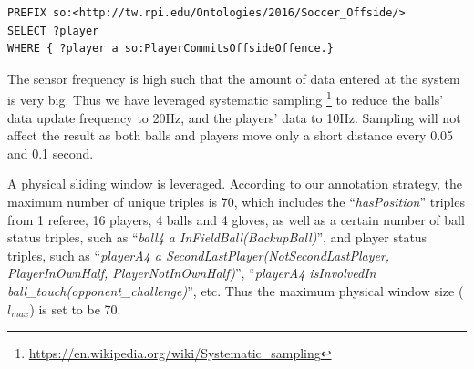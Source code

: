 \begin{lstlisting}[language=SPARQL,caption={Offside Offence Detection Query},basicstyle=\small,frame=single]
PREFIX so:<http://tw.rpi.edu/Ontologies/2016/Soccer_Offside/>
SELECT ?player 
WHERE { ?player a so:PlayerCommitsOffsideOffence.}
\end{lstlisting}

The sensor frequency is high such that the amount of data entered at the system is very big. 
Thus we have leveraged systematic sampling \footnote{\url{https://en.wikipedia.org/wiki/Systematic_sampling}} to reduce the balls' data update frequency to 20Hz, and the players' data to 10Hz.
Sampling will not affect the result as both balls and players move only a short distance every 0.05 and 0.1 second.

A physical sliding window is leveraged.
According to our annotation strategy, the maximum number of unique triples is 70, which includes the ``\textit{hasPosition}'' triples from 1 referee, 16 players, 4 balls and 4 gloves, as well as a certain number of ball status triples, such as ``\textit{ball4 a InFieldBall(BackupBall)}'', and player status triples, such as ``\textit{playerA4 a SecondLastPlayer(NotSecondLastPlayer, PlayerInOwnHalf, PlayerNotInOwnHalf)}'', ``\textit{playerA4 isInvolvedIn ball\_touch(opponent\_challenge)}'', etc. 
Thus the maximum physical window size ($l_{max}$) is set to be 70.

